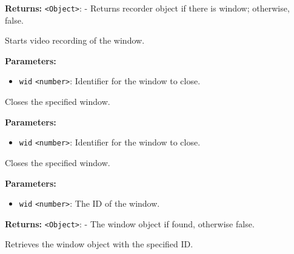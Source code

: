 \documentclass[12pt,a4paper]{article}
\begin{document}
\noindent \textbf{Returns:} \texttt{<Object>}: - Returns recorder object if there is window; otherwise, false.

\noindent Starts video recording of the window.

\vspace{5mm}
\noindent {}


\noindent \textbf{Parameters:}
\begin{itemize}
  \item \texttt{wid} \texttt{<number>}: Identifier for the window to close.
\end{itemize}

\noindent Closes the specified window.

\vspace{5mm}
\noindent {}


\noindent \textbf{Parameters:}
\begin{itemize}
  \item \texttt{wid} \texttt{<number>}: Identifier for the window to close.
\end{itemize}

\noindent Closes the specified window.

\vspace{5mm}
\noindent {}


\noindent \textbf{Parameters:}
\begin{itemize}
  \item \texttt{wid} \texttt{<number>}: The ID of the window.
\end{itemize}

\noindent \textbf{Returns:} \texttt{<Object>}: - The window object if found, otherwise false.

\noindent Retrieves the window object with the specified ID.

\vspace{5mm}
\noindent {}
\end{document}
